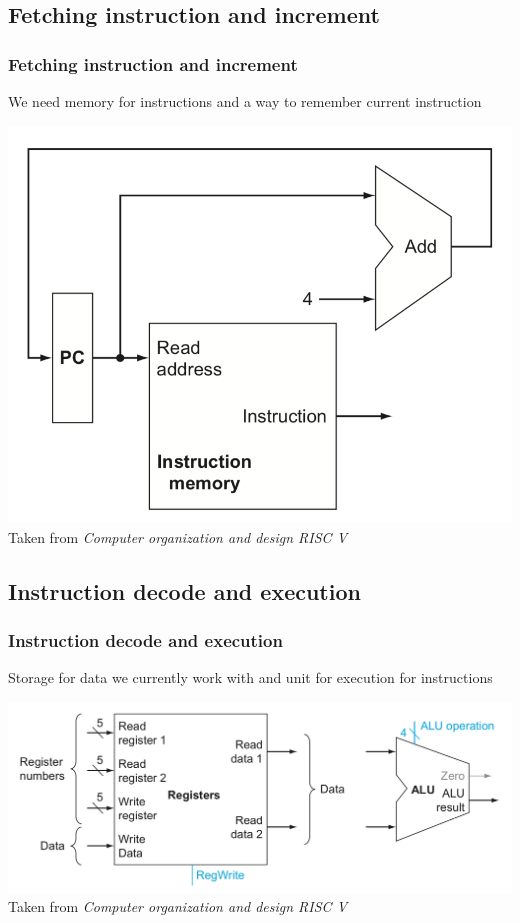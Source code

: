 \documentclass{beamer}
\begin{document}
    \begin{frame}
        \subsection{Fetching instruction and increment}
        \frametitle{Fetching instruction and increment}
        \centering
        \vspace{-0.5cm}
        We need memory for instructions and a way to remember current instruction

        \includegraphics[scale=0.4]{"Pictures and plots/IFINC"} \\
        \scriptsize{Taken from \textit{Computer organization and design RISC V}}
        
    \end{frame}

    \begin{frame}
        \subsection{Instruction decode and execution}
        \frametitle{Instruction decode and execution}
        \centering
        \vspace{-0.5cm}
        Storage for data we currently work with and unit for execution for instructions
        
        \includegraphics[scale=0.4]{"Pictures and plots/RegALU"} \\
        \scriptsize{Taken from \textit{Computer organization and design RISC V}}
        
    \end{frame}
\end{document}
